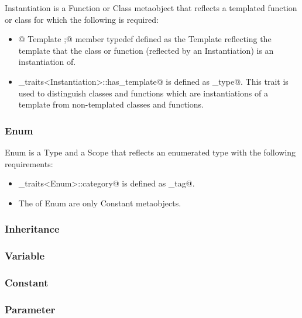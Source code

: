 {\metaobject Instantiation} is a {\metaobject Function} or {\metaobject Class} metaobject
that reflects a templated function or class for which the following is required:

\begin{itemize}

	\item{\verb@typedef @ {\metaobject Template} \verb@model;@} member typedef defined
	as the {\metaobject Template} reflecting the template that the class or function 
	(reflected by an {\metaobject Instantiation}) is an instantiation of.

	\item \verb@metaobject_traits<Instantiation>::has_template@ is defined as \verb@true_type@.
	This trait is used to distinguish classes and functions which are instantiations
	of a template from non-templated classes and functions.
\end{itemize}

\subsubsection{Enum}

{\metaobject Enum} is a {\metaobject Type} and a {\metaobject Scope} that reflects an enumerated
type with the following requirements:

\begin{itemize}
	\item \verb@metaobject_traits<Enum>::category@ is defined as \verb@enum_tag@.

	\item The \verb@members@ of {\metaobject Enum} are only {\metaobject Constant} metaobjects.
\end{itemize}

\subsubsection{Inheritance}

\subsubsection{Variable}

\subsubsection{Constant}

\subsubsection{Parameter}
